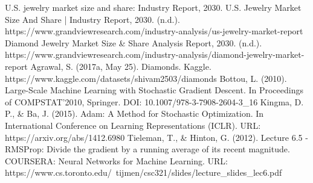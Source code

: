 \documentclass[conference]{IEEEtran}
\begin{document}
\begin{thebibliography}{00}
 U.S. jewelry market size and share: Industry Report, 2030. U.S. Jewelry Market Size And Share | Industry Report, 2030. (n.d.). https://www.grandviewresearch.com/industry-analysis/us-jewelry-market-report
 Diamond Jewelry Market Size \& Share Analysis Report, 2030. (n.d.). https://www.grandviewresearch.com/industry-analysis/diamond-jewelry-market-report
 Agrawal, S. (2017a, May 25). Diamonds. Kaggle. https://www.kaggle.com/datasets/shivam2503/diamonds
 Bottou, L. (2010). Large-Scale Machine Learning with Stochastic Gradient Descent. In Proceedings of COMPSTAT'2010, Springer. DOI: 10.1007/978-3-7908-2604-3\_16
 Kingma, D. P., \& Ba, J. (2015). Adam: A Method for Stochastic Optimization. In International Conference on Learning Representations (ICLR). URL: https://arxiv.org/abs/1412.6980
 Tieleman, T., \& Hinton, G. (2012). Lecture 6.5 - RMSProp: Divide the gradient by a running average of its recent magnitude. COURSERA: Neural Networks for Machine Learning. URL: https://www.cs.toronto.edu/~tijmen/csc321/slides/lecture\_slides\_lec6.pdf

\end{thebibliography}
\vspace{12pt}
\end{document}

